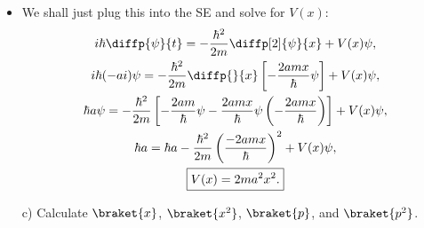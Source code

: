 \begin{example}
    \begin{itemize}
        \item We shall just plug this into the SE and solve for $V(x)$:
            \begin{gather*}
                i\hbar\diffp{\psi}{t} = -\frac{\hbar^2}{2m} \diffp[2]{\psi}{x} + V(x)\psi, \\
                i\hbar (-ai) \psi = -\frac{\hbar^2}{2m} \diffp{}{x}\left[-\frac{2amx}{\hbar} \psi\right] + V(x)\psi, \\
                \hbar a \psi = -\frac{\hbar^2}{2m} \left[-\frac{2am}{\hbar}\psi - \frac{2amx}{\hbar}\psi\left(-\frac{2amx}{\hbar}\right)\right] + V(x)\psi, \\
                \hbar a = \hbar a - \frac{\hbar^2}{2m} \left(\frac{-2amx}{\hbar}\right)^2 + V(x)\psi, \\
                \boxed{V(x) = 2ma^2x^2.}
            \end{gather*}
    \end{itemize}


    \begin{itemize}
        \item[c)] Calculate $\braket{x}$, $\braket{x^2}$, $\braket{p}$, and $\braket{p^2}$.
    \end{itemize}


\end{example}
